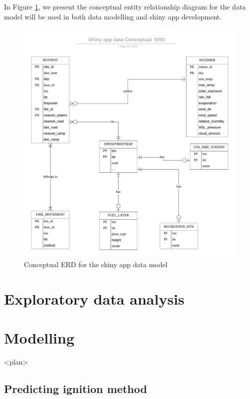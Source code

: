 \documentclass{monashthesis}
\begin{document}
In Figure \ref{fig:ERD}, we present the conceptual entity relationship
diagram for the data model will be used in both data modelling and shiny
app development.

\begin{figure}
\centering
\includegraphics{figures/Shiny_app_data_Conceptual_ERD.jpeg}
\caption{Conceptual ERD for the shiny app data model \label{fig:ERD}}
\end{figure}

\chapter{Exploratory data analysis}\label{exploratory-data-analysis}

\chapter{Modelling}\label{modelling}

\textless{}plan\textgreater{}

\section{Predicting ignition method}\label{predicting-ignition-method}
\end{document}
